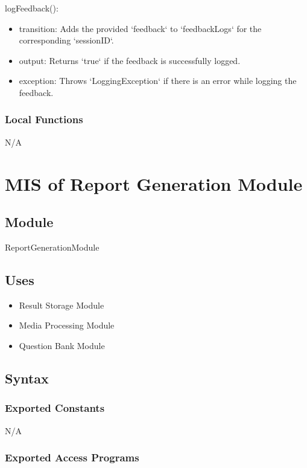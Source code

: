 \documentclass[12pt, titlepage]{article}
\begin{document}
\noindent logFeedback():
\begin{itemize}
\item transition: Adds the provided `feedback` to `feedbackLogs` for the corresponding `sessionID`.
\item output: Returns `true` if the feedback is successfully logged.
\item exception: Throws `LoggingException` if there is an error while logging the feedback.
\end{itemize}

\subsubsection{Local Functions}

N/A
\section{MIS of Report Generation Module} \label{ReportGenerationModule}

\subsection{Module}

ReportGenerationModule

\subsection{Uses}

\begin{itemize}
\item Result Storage Module
\item Media Processing Module
\item Question Bank Module
\end{itemize}

\subsection{Syntax}

\subsubsection{Exported Constants}

N/A

\subsubsection{Exported Access Programs}
\end{document}
